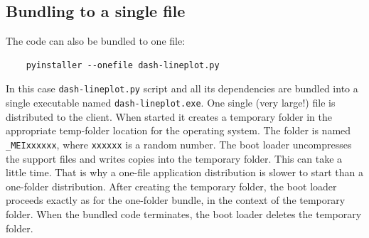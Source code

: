 \subsection{Bundling to a single file}

The code can also be bundled to one file:

\footnotesize
\begin{lstlisting}
    pyinstaller --onefile dash-lineplot.py
\end{lstlisting}
\normalsize

In this case \texttt{dash-lineplot.py} script and all its dependencies are bundled into a single executable
named \texttt{dash-lineplot.exe}. One single (very large!) file is distributed to the client.  When started it creates a temporary folder in the appropriate temp-folder location for the operating system. The folder is named \texttt{\_MEIxxxxxx}, where \texttt{xxxxxx} is a random number. The boot loader uncompresses the support files and writes copies into the temporary folder. This can take a little time. That is why a one-file application distribution is slower to start than a one-folder distribution. After creating the temporary folder, the boot loader proceeds exactly
as for the one-folder bundle, in the context of the temporary folder. When the bundled code terminates,
the boot loader deletes the temporary folder.



